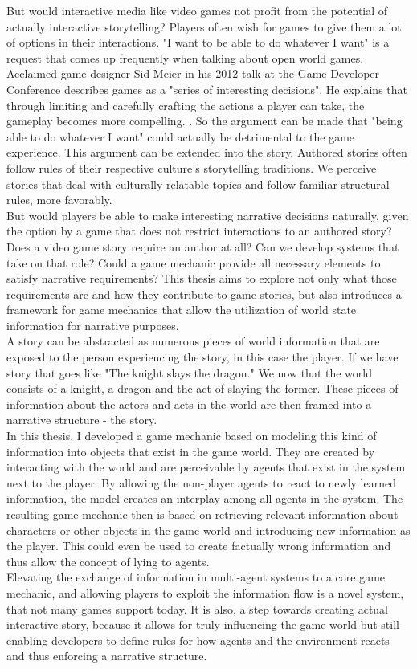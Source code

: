 But would interactive media like video games not profit from the potential of actually interactive storytelling? Players often wish for games to give them a lot of options in their interactions. "I want to be able to do whatever I want" is a request that comes up frequently when talking about open world games. Acclaimed game designer Sid Meier in his 2012 talk at the Game Developer Conference describes games as a "series of interesting decisions". He explains that through limiting and carefully crafting the actions a player can take, the gameplay becomes more compelling. \cite{Dring2018}. So the argument can be made that "being able to do whatever I want" could actually be detrimental to the game experience. This argument can be extended into the story. Authored stories often follow rules of their respective culture's storytelling traditions. We perceive stories that deal with culturally relatable topics and follow familiar structural rules, more favorably. \cite{Cooney2017}\\
But would players be able to make interesting narrative decisions naturally, given the option by a game that does not restrict interactions to an authored story? Does a video game story require an author at all? Can we  develop systems that take on that role? Could a game mechanic provide all necessary elements to satisfy narrative requirements? This thesis aims to explore not only what those requirements are and how they contribute to game stories, but also introduces a framework for game mechanics that allow the utilization of world state information for narrative purposes.\\
A story can be abstracted as numerous pieces of world information that are exposed to the person experiencing the story, in this case the player. If we have story that goes like "The knight slays the dragon." We now that the world consists of a knight, a dragon and the act of slaying the former. These pieces of information about the actors and acts in the world are then framed into a narrative structure - the story.\\
In this thesis, I developed a game mechanic based on modeling this kind of information into objects that exist in the game world. They are created by interacting with the world and are perceivable by agents that exist in the system next to the player. By allowing the non-player agents to react to newly learned information, the model creates an interplay among all agents in the system. The resulting game mechanic then is based on retrieving relevant information about characters or other objects in the game world and introducing new information as the player. This could even be used to create factually wrong information and thus allow the concept of lying to agents.\\
Elevating the exchange of information in multi-agent systems to a core game mechanic, and allowing players to exploit the information flow is a novel system, that not many games support today. It is also, a step towards creating actual interactive story, because it allows for truly influencing the game world but still enabling developers to define rules for how agents and the environment reacts and thus enforcing a narrative structure.